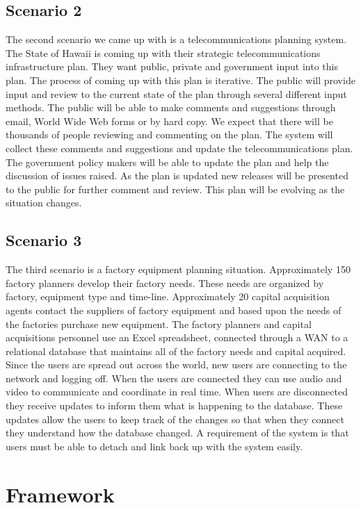 \subsection{Scenario 2}

The second scenario we came up with is a telecommunications planning
system.  The State of Hawaii is coming up with their strategic
telecommunications infrastructure plan.  They want public, private and
government input into this plan.  The process of coming up with this plan
is iterative.  The public will provide input and review to the current
state of the plan through several different input methods.  The public will
be able to make comments and suggestions through email, World Wide Web
forms or by hard copy.  We expect that there will be thousands of people
reviewing and commenting on the plan.  The system will collect these
comments and suggestions and update the telecommunications plan.  The
government policy makers will be able to update the plan and help the
discussion of issues raised.  As the plan is updated new releases will be
presented to the public for further comment and review.  This plan will be
evolving as the situation changes.

\subsection{Scenario 3}

The third scenario is a factory equipment planning situation.
Approximately 150 factory planners develop their factory needs.  These
needs are organized by factory, equipment type and time-line.
Approximately 20 capital acquisition agents contact the suppliers of
factory equipment and based upon the needs of the factories purchase new
equipment.  The factory planners and capital acquisitions personnel use an
Excel spreadsheet, connected through a WAN to a relational database that
maintains all of the factory needs and capital acquired.  Since the users
are spread out across the world, new users are connecting to the network
and logging off.  When the users are connected they can use audio and video
to communicate and coordinate in real time.  When users are disconnected
they receive updates to inform them what is happening to the database.
These updates allow the users to keep track of the changes so that when
they connect they understand how the database changed.  A requirement of
the system is that users must be able to detach and link back up with the
system easily.

\section{Framework}

